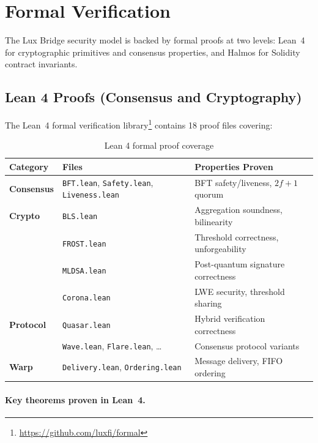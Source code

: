 \section{Formal Verification}
\label{sec:formal}

The Lux Bridge security model is backed by formal proofs at two levels: Lean~4 for cryptographic primitives and consensus properties, and Halmos for Solidity contract invariants.

\subsection{Lean 4 Proofs (Consensus and Cryptography)}

The Lean~4 formal verification library\footnote{\url{https://github.com/luxfi/formal}} contains 18 proof files covering:

\begin{table}[h]
\centering
\begin{tabular}{lll}
\toprule
\textbf{Category} & \textbf{Files} & \textbf{Properties Proven} \\
\midrule
\textbf{Consensus} & \texttt{BFT.lean}, \texttt{Safety.lean}, \texttt{Liveness.lean} & BFT safety/liveness, $2f+1$ quorum \\
\textbf{Crypto} & \texttt{BLS.lean} & Aggregation soundness, bilinearity \\
& \texttt{FROST.lean} & Threshold correctness, unforgeability \\
& \texttt{MLDSA.lean} & Post-quantum signature correctness \\
& \texttt{Corona.lean} & LWE security, threshold sharing \\
\textbf{Protocol} & \texttt{Quasar.lean} & Hybrid verification correctness \\
& \texttt{Wave.lean}, \texttt{Flare.lean}, \ldots & Consensus protocol variants \\
\textbf{Warp} & \texttt{Delivery.lean}, \texttt{Ordering.lean} & Message delivery, FIFO ordering \\
\bottomrule
\end{tabular}
\caption{Lean 4 formal proof coverage}
\end{table}

\paragraph{Key theorems proven in Lean~4.}


